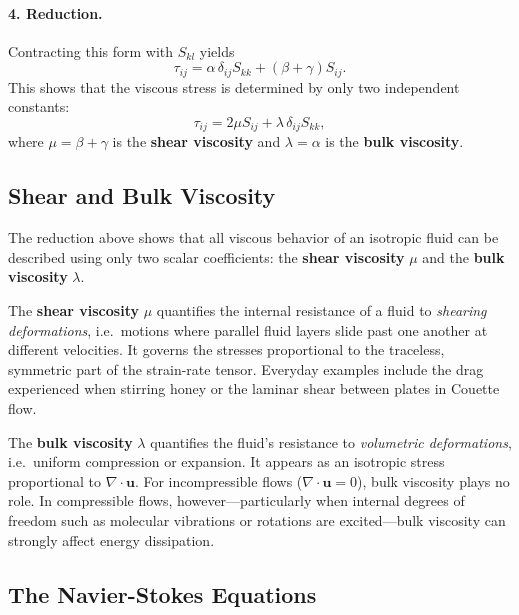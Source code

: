 \paragraph{4. Reduction.}
Contracting this form with $S_{kl}$ yields
\[
\tau_{ij} = \alpha \,\delta_{ij} S_{kk} + (\beta + \gamma) S_{ij}.
\]
This shows that the viscous stress is determined by only two independent constants:
\[
\tau_{ij} = 2\mu S_{ij} + \lambda \,\delta_{ij} S_{kk},
\]
where $\mu = \beta + \gamma$ is the \textbf{shear viscosity} and $\lambda = \alpha$ is the \textbf{bulk viscosity}.

\subsection{Shear and Bulk Viscosity}

The reduction above shows that all viscous behavior of an isotropic fluid can be described using only two scalar coefficients: the \textbf{shear viscosity} $\mu$ and the \textbf{bulk viscosity} $\lambda$.

\begin{definition}\label{def:shear-viscosity}
The \textbf{shear viscosity} $\mu$ quantifies the internal resistance of a fluid to \emph{shearing deformations}, i.e.~motions where parallel fluid layers slide past one another at different velocities. It governs the stresses proportional to the traceless, symmetric part of the strain-rate tensor. Everyday examples include the drag experienced when stirring honey or the laminar shear between plates in Couette flow.
\end{definition}

\begin{definition}\label{def:bulk-viscosity}
The \textbf{bulk viscosity} $\lambda$ quantifies the fluid's resistance to \emph{volumetric deformations}, i.e.~uniform compression or expansion. It appears as an isotropic stress proportional to $\nabla \cdot \mathbf{u}$. For incompressible flows ($\nabla \cdot \mathbf{u} = 0$), bulk viscosity plays no role. In compressible flows, however—particularly when internal degrees of freedom such as molecular vibrations or rotations are excited—bulk viscosity can strongly affect energy dissipation.
\end{definition}


\subsection{The Navier-Stokes Equations}




